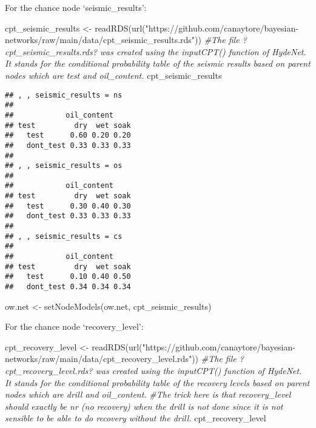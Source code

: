 \documentclass[
]{article}
\newenvironment{Shaded}{\begin{snugshade}}{\end{snugshade}}
\newcommand{\CommentTok}[1]{\textcolor[rgb]{0.56,0.35,0.01}{\textit{#1}}}
\newcommand{\FunctionTok}[1]{\textcolor[rgb]{0.00,0.00,0.00}{#1}}
\newcommand{\NormalTok}[1]{#1}
\newcommand{\OtherTok}[1]{\textcolor[rgb]{0.56,0.35,0.01}{#1}}
\newcommand{\StringTok}[1]{\textcolor[rgb]{0.31,0.60,0.02}{#1}}
\begin{document}
For the chance node `seismic\_results':

\begin{Shaded}
\begin{Highlighting}[]
\NormalTok{cpt\_seismic\_results }\OtherTok{\textless{}{-}} \FunctionTok{readRDS}\NormalTok{(}\FunctionTok{url}\NormalTok{(}\StringTok{"https://github.com/canaytore/bayesian{-}networks/raw/main/data/cpt\_seismic\_results.rds"}\NormalTok{))}
\CommentTok{\#The file ?cpt\_seismic\_results.rds? was created using the inputCPT() function of HydeNet. It stands for the conditional probability table of the seismic results based on parent nodes which are \textquotesingle{}test\textquotesingle{} and \textquotesingle{}oil\_content\textquotesingle{}.}
\NormalTok{cpt\_seismic\_results}
\end{Highlighting}
\end{Shaded}

\begin{verbatim}
## , , seismic_results = ns
## 
##            oil_content
## test         dry  wet soak
##   test      0.60 0.20 0.20
##   dont_test 0.33 0.33 0.33
## 
## , , seismic_results = os
## 
##            oil_content
## test         dry  wet soak
##   test      0.30 0.40 0.30
##   dont_test 0.33 0.33 0.33
## 
## , , seismic_results = cs
## 
##            oil_content
## test         dry  wet soak
##   test      0.10 0.40 0.50
##   dont_test 0.34 0.34 0.34
\end{verbatim}

\begin{Shaded}
\begin{Highlighting}[]
\NormalTok{ow.net }\OtherTok{\textless{}{-}} \FunctionTok{setNodeModels}\NormalTok{(ow.net, cpt\_seismic\_results)}
\end{Highlighting}
\end{Shaded}

For the chance node `recovery\_level':

\begin{Shaded}
\begin{Highlighting}[]
\NormalTok{cpt\_recovery\_level }\OtherTok{\textless{}{-}} \FunctionTok{readRDS}\NormalTok{(}\FunctionTok{url}\NormalTok{(}\StringTok{"https://github.com/canaytore/bayesian{-}networks/raw/main/data/cpt\_recovery\_level.rds"}\NormalTok{))}
\CommentTok{\#The file ?cpt\_recovery\_level.rds? was created using the inputCPT() function of HydeNet. It stands for the conditional probability table of the recovery levels based on parent nodes which are \textquotesingle{}drill\textquotesingle{} and \textquotesingle{}oil\_content\textquotesingle{}.}
\CommentTok{\#The trick here is that \textquotesingle{}recovery\_level\textquotesingle{} should exactly be nr (no recovery) when the drill is not done since it is not sensible to be able to do \textquotesingle{}recovery\textquotesingle{} without the \textquotesingle{}drill\textquotesingle{}.}
\NormalTok{cpt\_recovery\_level}
\end{Highlighting}
\end{Shaded}
\end{document}
